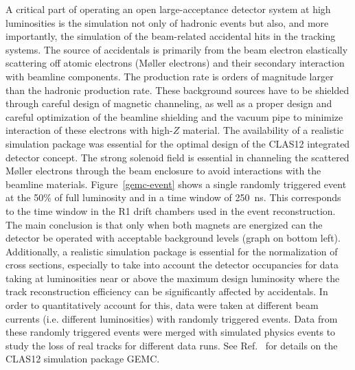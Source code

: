 \documentclass[final,3p,twocolumn]{elsarticle}
\begin{document}
A critical part of operating an open large-acceptance detector system at high luminosities is the simulation not
only of hadronic events but also, and more importantly, the simulation of the beam-related accidental hits in the
tracking systems. The source of accidentals is primarily from the beam electron elastically scattering off atomic
electrons (M{\o}ller electrons) and their secondary interaction with beamline components. The production rate
is orders of magnitude larger than the hadronic production rate. These background sources have to be shielded
through careful design of magnetic channeling, as well as a proper design and careful optimization  of the beamline 
shielding and the vacuum
pipe to minimize interaction of these electrons with high-$Z$ material. The availability of a realistic simulation
package was essential for the optimal design of the CLAS12 integrated detector concept. The strong solenoid
field is essential in channeling the scattered M{\o}ller electrons through the beam enclosure to avoid interactions
with the beamline materials. Figure~\ref{gemc-event} shows a single randomly triggered event at the 50\% of full 
luminosity and in a time window of 250~ns. This corresponds to the time window in the R1 drift chambers used in the event 
reconstruction. The main conclusion is that only when both magnets are energized can the detector be operated with 
acceptable background levels (graph on bottom left).  
Additionally, a realistic simulation package is essential for the normalization of cross sections, especially to take
into account the detector occupancies for data taking at luminosities near or above the maximum design luminosity
where the track reconstruction efficiency can be significantly affected by accidentals. In order to quantitatively
account for this, data were taken at different beam currents (i.e. different luminosities) with randomly triggered
events. Data from these randomly triggered events were merged with simulated physics events to study the loss
of real tracks for different data runs. See Ref.~\cite{GEMC} for details on the CLAS12 simulation package GEMC.
\end{document}

